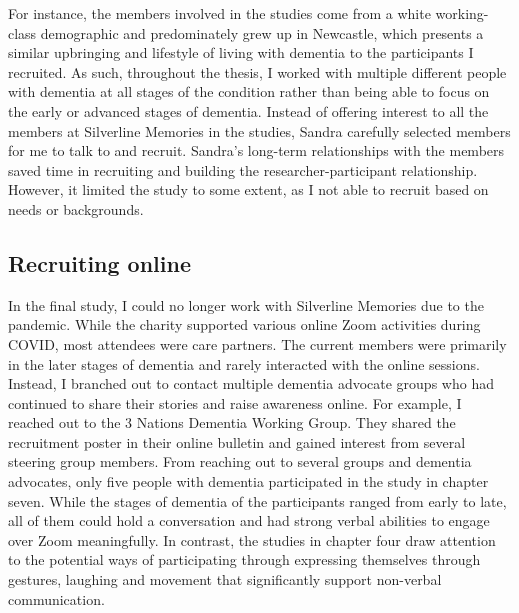 For instance, the members involved in the studies come from a white working-class demographic and predominately grew up in Newcastle, which presents a similar upbringing and lifestyle of living with dementia to the participants I recruited. As such, throughout the thesis, I worked with multiple different people with dementia at all stages of the condition rather than being able to focus on the early or advanced stages of dementia. Instead of offering interest to all the members at Silverline Memories in the studies, Sandra carefully selected members for me to talk to and recruit. Sandra's long-term relationships with the members saved time in recruiting and building the researcher-participant relationship. However,  it limited the study to some extent, as I not able to recruit based on needs or backgrounds.

\subsection{Recruiting online}
\label{Method:RecruitOnline}
In the final study, I could no longer work with Silverline Memories due to the pandemic. While the charity supported various online Zoom activities during COVID, most attendees were care partners. The current members were primarily in the later stages of dementia and rarely interacted with the online sessions. Instead, I branched out to contact multiple dementia advocate groups who had continued to share their stories and raise awareness online. For example, I reached out to the 3 Nations Dementia Working Group. They shared the recruitment poster in their online bulletin and gained interest from several steering group members. From reaching out to several groups and dementia advocates, only five people with dementia participated in the study in chapter seven. While the stages of dementia of the participants ranged from early to late, all of them could hold a conversation and had strong verbal abilities to engage over Zoom meaningfully. In contrast, the studies in chapter four draw attention to the potential ways of participating through expressing themselves through gestures, laughing and movement that significantly support non-verbal communication.

